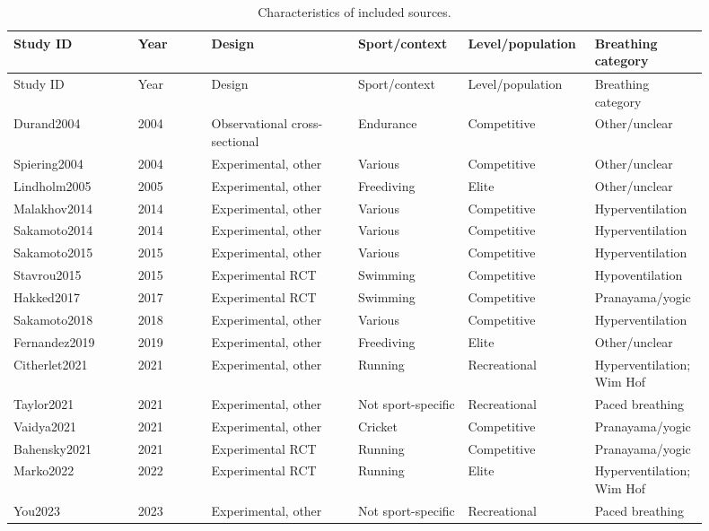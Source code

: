 \begin{landscape}
\begin{longtable}{@{}p{0.17\linewidth}p{0.10\linewidth}p{0.20\linewidth}p{0.15\linewidth}p{0.16\linewidth}p{0.12\linewidth}@{}}
\caption{Characteristics of included sources.}
\label{tab:study-characteristics}\\
\toprule
Study ID & Year & Design & Sport/context & Level/population & Breathing category \\
\midrule
\endfirsthead
\toprule
Study ID & Year & Design & Sport/context & Level/population & Breathing category \\
\midrule
\endhead
\bottomrule
\endfoot
Durand2004 & 2004 & Observational cross-sectional & Endurance & Competitive & Other/unclear \\
Spiering2004 & 2004 & Experimental, other & Various & Competitive & Other/unclear \\
Lindholm2005 & 2005 & Experimental, other & Freediving & Elite & Other/unclear \\
Malakhov2014 & 2014 & Experimental, other & Various & Competitive & Hyperventilation \\
Sakamoto2014 & 2014 & Experimental, other & Various & Competitive & Hyperventilation \\
Sakamoto2015 & 2015 & Experimental, other & Various & Competitive & Hyperventilation \\
Stavrou2015 & 2015 & Experimental RCT & Swimming & Competitive & Hypoventilation \\
Hakked2017 & 2017 & Experimental RCT & Swimming & Competitive & Pranayama/yogic \\
Sakamoto2018 & 2018 & Experimental, other & Various & Competitive & Hyperventilation \\
Fernandez2019 & 2019 & Experimental, other & Freediving & Elite & Other/unclear \\
Citherlet2021 & 2021 & Experimental, other & Running & Recreational & Hyperventilation; Wim Hof \\
Taylor2021 & 2021 & Experimental, other & Not sport-specific & Recreational & Paced breathing \\
Vaidya2021 & 2021 & Experimental, other & Cricket & Competitive & Pranayama/yogic \\
Bahensky2021 & 2021 & Experimental RCT & Running & Competitive & Pranayama/yogic \\
Marko2022 & 2022 & Experimental RCT & Running & Elite & Hyperventilation; Wim Hof \\
You2023 & 2023 & Experimental, other & Not sport-specific & Recreational & Paced breathing \\

\end{longtable}
\end{landscape}
